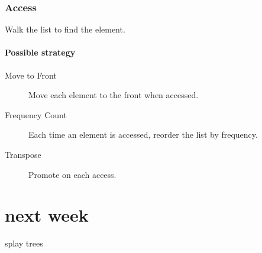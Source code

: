 \documentclass[a4paper]{article}
\begin{document}
\subsubsection{Access}
Walk the list to find the element.

\paragraph{Possible strategy}
\begin{description}
  \item[Move to Front] Move each element to the front when accessed.
  \item[Frequency Count] Each time an element is accessed, reorder the list by frequency.
  \item[Transpose] Promote on each access.
\end{description}

\section{next week}
splay trees
\end{document}

